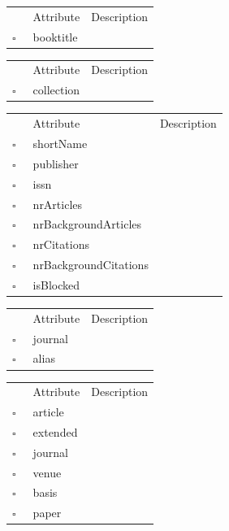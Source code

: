 \begin{table}
\caption{InBook  }

\begin{longtable}{llp{8cm}}
& Attribute & Description \\
$\square$\ & booktitle &  \\
\end{longtable}
\label{attr:InBook}
\end{table}

\begin{table}
\caption{InCollection  }

\begin{longtable}{llp{8cm}}
& Attribute & Description \\
$\square$\ & collection &  \\
\end{longtable}
\label{attr:InCollection}
\end{table}

\begin{table}
\caption{Journal  }

\begin{longtable}{llp{8cm}}
& Attribute & Description \\
$\square$\ & shortName &  \\
$\square$\ & publisher &  \\
$\square$\ & issn &  \\
$\square$\ & nrArticles &  \\
$\square$\ & nrBackgroundArticles &  \\
$\square$\ & nrCitations &  \\
$\square$\ & nrBackgroundCitations &  \\
$\square$\ & isBlocked &  \\
\end{longtable}
\label{attr:Journal}
\end{table}

\clearpage
\begin{table}
\caption{JournalAlias  }

\begin{longtable}{llp{8cm}}
& Attribute & Description \\
$\square$\ & journal &  \\
$\square$\ & alias &  \\
\end{longtable}
\label{attr:JournalAlias}
\end{table}

\begin{table}
\caption{Link  }

\begin{longtable}{llp{8cm}}
& Attribute & Description \\
$\square$\ & article &  \\
$\square$\ & extended &  \\
$\square$\ & journal &  \\
$\square$\ & venue &  \\
$\square$\ & basis &  \\
$\square$\ & paper &  \\
\end{longtable}
\label{attr:Link}
\end{table}

